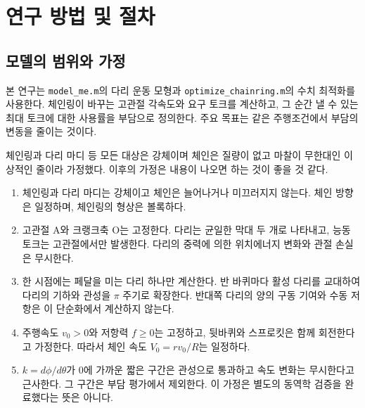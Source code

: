 \section{연구 방법 및 절차}

\subsection{모델의 범위와 가정}
본 연구는 \texttt{model\_me.m}의 다리 운동 모형과 \texttt{optimize\_chainring.m}의 수치 최적화를 사용한다. 체인링이 바꾸는 고관절 각속도와 요구 토크를 계산하고, 그 순간 낼 수 있는 최대 토크에 대한 사용률을 부담으로 정의한다. 주요 목표는 같은 주행조건에서 부담의 변동을 줄이는 것이다.

체인링과 다리 마디 등 모든 대상은 강체이며 체인은 질량이 없고 마찰이 무한대인 이상적인 줄이라 가정했다. 이후의 가정은 내용이 나오면 하는 것이 좋을 것 같다.
\begin{enumerate}
\item 체인링과 다리 마디는 강체이고 체인은 늘어나거나 미끄러지지 않는다. 체인 방향은 일정하며, 체인링의 형상은 볼록하다.
\item 고관절 A와 크랭크축 O는 고정한다. 다리는 균일한 막대 두 개로 나타내고, 능동 토크는 고관절에서만 발생한다. 다리의 중력에 의한 위치에너지 변화와 관절 손실은 무시한다.
\item 한 시점에는 페달을 미는 다리 하나만 계산한다. 반 바퀴마다 활성 다리를 교대하여 다리의 기하와 관성을 \(\pi\) 주기로 확장한다. 반대쪽 다리의 양의 구동 기여와 수동 저항은 이 단순화에서 계산하지 않는다.
\item 주행속도 \(v_0>0\)와 저항력 \(f\geq0\)는 고정하고, 뒷바퀴와 스프로킷은 함께 회전한다고 가정한다. 따라서 체인 속도 \(V_0=r v_0/R\)는 일정하다.
\item \(k=d\phi/d\theta\)가 0에 가까운 짧은 구간은 관성으로 통과하고 속도 변화는 무시한다고 근사한다. 그 구간은 부담 평가에서 제외한다. 이 가정은 별도의 동역학 검증을 완료했다는 뜻은 아니다.
\end{enumerate}


